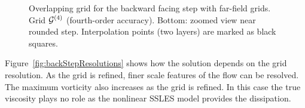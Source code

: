 \documentclass[11pt]{article}
\begin{document}
{
\begin{figure}[hbt]
\newcommand{\figWidth}{16cm}
\newcommand{\trimfig}[2]{\trimFigb{#1}{#2}{0.01}{.01}{.275}{.275}}
\newcommand{\figWidtha}{5.5cm}
\newcommand{\trimfiga}[2]{\trimFigb{#1}{#2}{0.0}{.0}{.0}{.0}}
\begin{center}\small
\caption{
Overlapping grid for the backward facing step with far-field grids. Grid ${\mathcal G}^{(4)}$ (fourth-order accuracy). Bottom: zoomed view near rounded step.
Interpolation points (two layers) are marked as black squares.
}
\label{fig:backStepRefineGrids}
\end{center}
\end{figure}
}

Figure~\ref{fig:backStepResolutions} shows how the solution depends on the grid resolution.
As the grid is refined, finer scale features of the flow can be resolved.
The maximum vorticity also increases as the grid is refined. 
In this case the true viscosity plays no role as the nonlinear SSLES model provides the dissipation.
\end{document}
